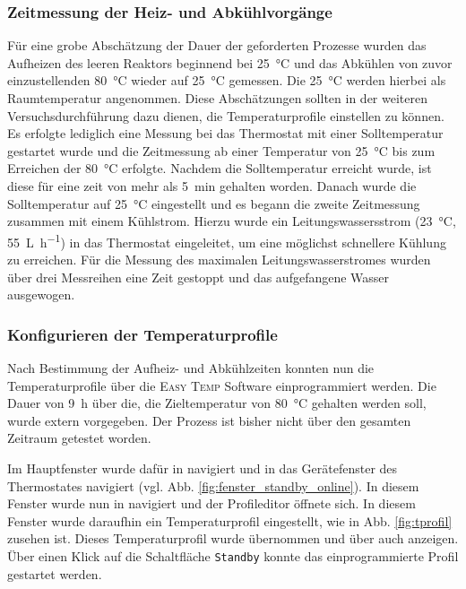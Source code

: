 \documentclass[a4paper, 11pt, draft=false]{scrartcl}
\begin{document}
	\subsubsection*{Zeitmessung der Heiz- und Abkühlvorgänge}
	Für eine grobe Abschätzung der Dauer der geforderten Prozesse wurden das Aufheizen des leeren Reaktors beginnend bei \SI{25}{\celsius} und das Abkühlen von zuvor einzustellenden \SI{80}{\celsius} wieder auf \SI{25}{\celsius} gemessen. Die \SI{25}{\celsius} werden hierbei als Raumtemperatur angenommen. Diese Abschätzungen sollten in der weiteren Versuchsdurchführung dazu dienen, die Temperaturprofile einstellen zu können.\\
	Es erfolgte lediglich eine Messung bei das Thermostat mit einer Solltemperatur gestartet wurde und die Zeitmessung ab einer Temperatur von \SI{25}{\celsius} bis zum Erreichen der \SI{80}{\celsius} erfolgte. Nachdem die Solltemperatur erreicht wurde, ist diese für eine zeit von mehr als \SI{5}{\minute} gehalten worden. Danach wurde die Solltemperatur auf \SI{25}{\celsius} eingestellt und es begann die zweite Zeitmessung zusammen mit einem Kühlstrom. Hierzu wurde ein Leitungswassersstrom (\SI{23}{\celsius}, \SI{55}{\liter\per \hour}) in das Thermostat eingeleitet, um eine möglichst schnellere Kühlung zu erreichen. Für die Messung des maximalen Leitungswasserstromes wurden über drei Messreihen eine Zeit gestoppt und das aufgefangene Wasser ausgewogen.
	
	\subsubsection*{Konfigurieren der Temperaturprofile}
	Nach Bestimmung der Aufheiz- und Abkühlzeiten konnten nun die Temperaturprofile über die \textsc{Easy Temp} Software einprogrammiert werden. Die Dauer von \SI{9}{\hour} über die, die Zieltemperatur von \SI{80}{\celsius} gehalten werden soll, wurde extern vorgegeben. Der Prozess ist bisher nicht über den gesamten Zeitraum getestet worden.
	
	Im Hauptfenster wurde dafür in  navigiert und in das Gerätefenster des Thermostates navigiert (vgl. Abb. \ref{fig:fenster_standby_online}). In diesem Fenster wurde nun in  navigiert und der Profileditor öffnete sich. In diesem Fenster wurde daraufhin ein Temperaturprofil eingestellt, wie in Abb. \ref{fig:tprofil} zusehen ist. Dieses Temperaturprofil wurde übernommen und über  auch anzeigen. Über einen Klick auf die Schaltfläche \texttt{Standby} konnte das einprogrammierte Profil gestartet werden.
	
\end{document}
